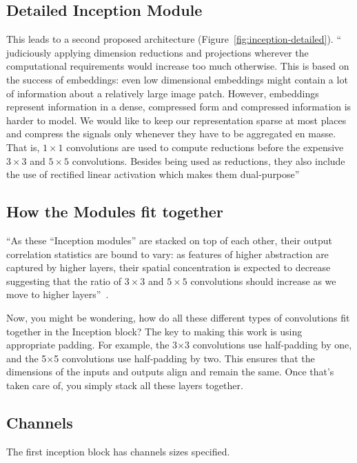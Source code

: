 \documentclass[11pt]{article}
\begin{document}
\subsection{Detailed Inception Module}

This leads to a second proposed architecture (Figure~\ref{fig:inception-detailed}). `` judiciously applying dimension reductions and projections wherever the computational requirements would increase too much otherwise. This is based on the success of embeddings: even low dimensional embeddings might contain a lot of information about a relatively large image patch. However, embeddings represent information in a dense, compressed form and compressed information is harder to model. We would like to keep our representation sparse at most places and compress the signals only whenever they have to be aggregated en masse. That is, $ 1\times1$ convolutions are used to compute reductions before the expensive $ 3\times3$ and $ 5\times5$ convolutions. Besides being used as reductions, they also include the use of rectified linear activation which makes them dual-purpose''~\cite{Inception}

\subsection{How the Modules fit together}

``As these “Inception modules” are stacked on top of each other, their output correlation statistics are bound to vary: as features of higher abstraction are captured by higher layers, their spatial concentration is expected to decrease suggesting that the ratio of $ 3\times3$ and $ 5\times5$ convolutions should increase as we move to higher layers''~\cite{Inception}.

Now, you might be wondering, how do all these different types of convolutions fit together in the Inception block? The key to making this work is using appropriate padding. For example, the 3$\times$3 convolutions use half-padding by one, and the 5$\times$5 convolutions use half-padding by two. This ensures that the dimensions of the inputs and outputs align and remain the same. Once that's taken care of, you simply stack all these layers together.

\subsection{Channels}

The first inception block has channels sizes specified.
\end{document}
